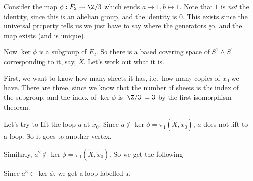 \documentclass[a4paper]{article}
\begin{document}
\begin{eg}
  Consider the map $\phi: F_2 \to \Z/3$ which sends $a \mapsto 1, b \mapsto 1$. Note that $1$ is \emph{not} the identity, since this is an abelian group, and the identity is $0$. This exists since the universal property tells us we just have to say where the generators go, and the map exists (and is unique).

  Now $\ker\phi$ is a subgroup of $F_2$. So there is a based covering space of $S^1 \wedge S^1$ corresponding to it, say, $\tilde{X}$. Let's work out what it is.

  First, we want to know how many sheets it has, i.e.\ how many copies of $x_0$ we have. There are three, since we know that the number of sheets is the index of the subgroup, and the index of $\ker \phi$ is $|\Z/3| = 3$ by the first isomorphism theorem.
  \begin{center}
  \end{center}
  Let's try to lift the loop $a$ at $\tilde{x}_0$. Since $a \not\in \ker\phi = \pi_1(\tilde{X}, \tilde{x}_0)$, $a$ does not lift to a loop. So it goes to another vertex.
  \begin{center}
  \end{center}
  Similarly, $a^2 \not\in \ker\phi = \pi_1(\tilde{X}, \tilde{x}_0)$. So we get the following
  \begin{center}
  \end{center}
  Since $a^3 \in \ker \phi$, we get a loop labelled $a$.
  \begin{center}
\end{center}
\end{eg}
\end{document}
